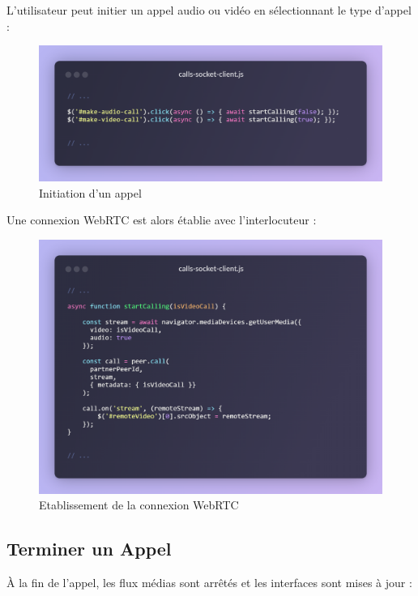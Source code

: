 L’utilisateur peut initier un appel audio ou vidéo en sélectionnant le type d’appel :

\begin{figure}[H]
    \centering
    \includegraphics[width=15cm]{assets/annexes/snippet (24).png}
    \caption{ Initiation d'un appel}
\end{figure}

Une connexion WebRTC est alors établie avec l’interlocuteur :

\begin{figure}[H]
    \centering
    \includegraphics[width=15cm]{assets/annexes/snippet (25).png}
    \caption{ Etablissement de la connexion WebRTC}
\end{figure}


\subsection*{Terminer un Appel}

À la fin de l’appel, les flux médias sont arrêtés et les interfaces sont mises à jour :

